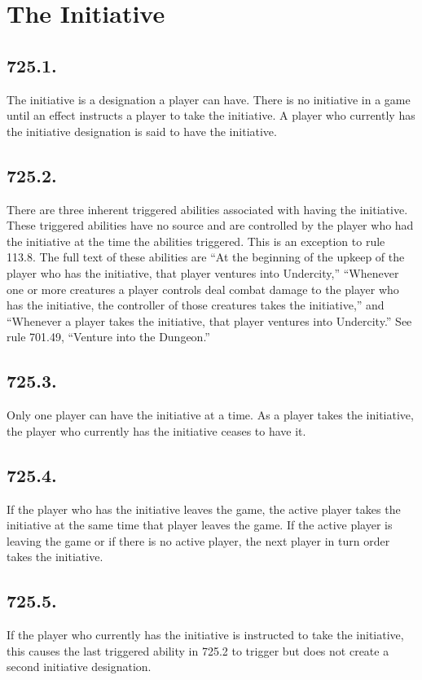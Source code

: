 \section{The Initiative}
\subsection*{725.1.}
The initiative is a designation a player can have. There is no initiative in a game until an effect instructs a player to take the initiative. A player who currently has the initiative designation is said to have the initiative.

\subsection*{725.2.}
There are three inherent triggered abilities associated with having the initiative. These triggered abilities have no source and are controlled by the player who had the initiative at the time the abilities triggered. This is an exception to rule 113.8. The full text of these abilities are “At the beginning of the upkeep of the player who has the initiative, that player ventures into Undercity,” “Whenever one or more creatures a player controls deal combat damage to the player who has the initiative, the controller of those creatures takes the initiative,” and “Whenever a player takes the initiative, that player ventures into Undercity.” See rule 701.49, “Venture into the Dungeon.”

\subsection*{725.3.}
Only one player can have the initiative at a time. As a player takes the initiative, the player who currently has the initiative ceases to have it.

\subsection*{725.4.}
If the player who has the initiative leaves the game, the active player takes the initiative at the same time that player leaves the game. If the active player is leaving the game or if there is no active player, the next player in turn order takes the initiative.

\subsection*{725.5.}
If the player who currently has the initiative is instructed to take the initiative, this causes the last triggered ability in 725.2 to trigger but does not create a second initiative designation.


